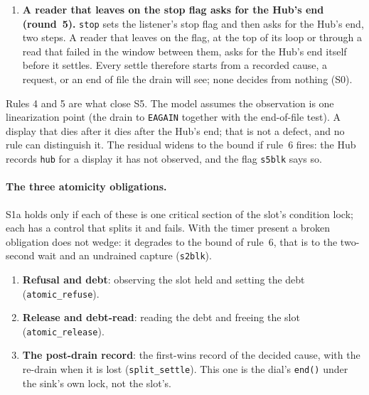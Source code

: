 \documentclass[a4paper,10pt,fleqn]{article}
\begin{document}
\begin{enumerate}
    scene reaches the ledger, and the display is not reaped (round~5's
    whole-write deadline did all three, the control
    \texttt{whole\_write\_deadline}; property S7).  The keepalive treats progress
    within $D$, a byte in either direction, as liveness and needs no lock to see
    it (\texttt{KPing}); the model does not check this half, which is an
    obligation on the code (S7).  The
    drain's ceiling stays strictly above $D$, so a drain behind a writer that
    stalls waits at most $D$ and reads the acks.  A settle behind a writer that
    keeps progressing falls to the late path, which captures, and the capture's
    shutdown ends the writer (\texttt{WStuckOut}).  The bounds: a stalled dial
    ends within $D$ of its last progress; a settle behind a progressing writer
    ends within the ceiling plus the 2~s bound.
  \item \textbf{A reader that leaves on the stop flag asks for the Hub's end
    (round~5).}  \texttt{stop} sets the listener's stop flag and then asks for
    the Hub's end, two steps.  A reader that leaves on the flag, at the top of
    its loop or through a read that failed in the window between them, asks for
    the Hub's end itself before it settles.  Every settle therefore starts from a
    recorded cause, a request, or an end of file the drain will see; none
    decides from nothing (S0).
\end{enumerate}

Rules 4 and 5 are what close S5.  The model assumes the observation is one
linearization point (the drain to \texttt{EAGAIN} together with the end-of-file
test).  A display that dies after it dies after the Hub's end; that is not a
defect, and no rule can distinguish it.  The residual widens to the bound if
rule~6 fires: the Hub records \texttt{hub} for a display it has not observed, and
the flag \texttt{s5blk} says so.

\paragraph{The three atomicity obligations.}
S1a holds only if each of these is one critical section of the slot's condition
lock; each has a control that splits it and fails.  With the timer present a
broken obligation does not wedge: it degrades to the bound of rule~6, that is to
the two-second wait and an undrained capture (\texttt{s2blk}).
\begin{enumerate}
  \item \textbf{Refusal and debt}: observing the slot held and setting the debt
    (\texttt{atomic\_refuse}).
  \item \textbf{Release and debt-read}: reading the debt and freeing the slot
    (\texttt{atomic\_release}).
  \item \textbf{The post-drain record}: the first-wins record of the decided
    cause, with the re-drain when it is lost (\texttt{split\_settle}).  This one
    is the dial's \texttt{end()} under the sink's own lock, not the slot's.
\end{enumerate}
\end{document}
